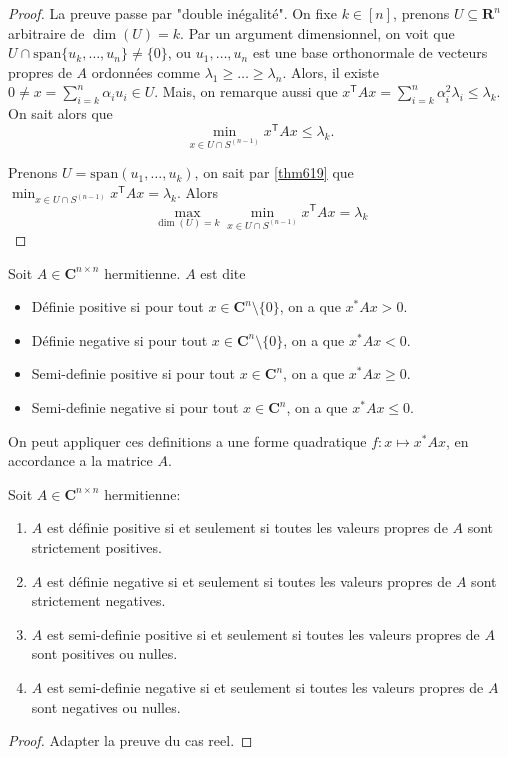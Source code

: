 \begin{proof}
La preuve passe par "double inégalité". On fixe $k\in[n]$, prenons $U\subseteq \mathbf{R}^{n}$ arbitraire de $\dim(U)=k$. Par un argument dimensionnel, on voit que $U\cap \mathrm{span}\{ u_{k},\dots,u_{n} \}\neq \{ 0 \}$, ou $u_{1},\dots,u_{n}$ est une base orthonormale de vecteurs propres de $A$ ordonnées comme $\lambda_{1}\ge \dots\ge \lambda _{n}$. Alors, il existe $0\neq x=\sum_{i=k}^{n}\alpha _{i}u_{i}\in U$. Mais, on remarque aussi que $x^{\mathsf{T}}Ax=\sum_{i=k}^{n}\alpha _{i}^{2}\lambda _{i}\le \lambda _{k}$. On sait alors que 
$$
\min_{x \in U\cap S^{(n-1)}}x^{\mathsf{T}}Ax\le \lambda _{k}.
$$

Prenons $U=\mathrm{span}(u_{1},\dots,u_{k})$, on sait par \ref{thm619} que $\min_{x \in U\cap S^{(n-1)}}x^{\mathsf{T}}Ax=\lambda _{k}$. Alors 
$$
\max_{\dim(U)=k} \min_{x \in U\cap S^{(n-1)}}x^{\mathsf{T}}Ax=\lambda _{k}
$$
\end{proof}
\begin{definition}
Soit $A\in \mathbf{C}^{n\times n}$ hermitienne. $A$ est dite
\begin{itemize}
\item Définie positive si pour tout $x \in \mathbf{C}^{n}\setminus \{ 0 \}$, on a que $x^{*}Ax>0$.
\item Définie negative si pour tout $x \in \mathbf{C}^{n}\setminus \{ 0 \}$, on a que $x^{*}Ax<0$.
\item Semi-definie positive si pour tout $x \in \mathbf{C}^{n}$, on a que $x^{*}Ax\ge 0$.
\item Semi-definie negative si pour tout $x \in \mathbf{C}^{n}$, on a que $x^{*}Ax\le 0$.
\end{itemize}

On peut appliquer ces definitions a une forme quadratique $f:x\mapsto x^{*}Ax$, en accordance a la matrice $A$.
\end{definition}
\begin{theorem}
Soit $A\in \mathbf{C}^{n\times n}$ hermitienne: 
\begin{enumerate}
\item $A$ est définie positive si et seulement si toutes les valeurs propres de $A$ sont strictement positives.
\item $A$ est définie negative si et seulement si toutes les valeurs propres de $A$ sont strictement negatives.
\item $A$ est semi-definie positive si et seulement si toutes les valeurs propres de $A$ sont positives ou nulles.
\item $A$ est semi-definie negative si et seulement si toutes les valeurs propres de $A$ sont negatives ou nulles.
\end{enumerate}
\end{theorem}
\begin{proof}
Adapter la preuve du cas reel.
\end{proof}

